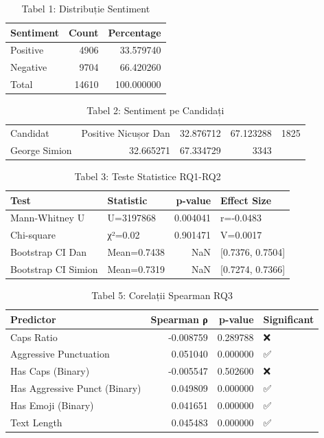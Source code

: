 
\begin{table}
\caption{Tabel 1: Distribuție Sentiment}
\label{tab:tabel_1:_distribuție_sentiment}
\begin{tabular}{lrr}
\toprule
Sentiment & Count & Percentage \\
\midrule
Positive & 4906 & 33.579740 \\
Negative & 9704 & 66.420260 \\
Total & 14610 & 100.000000 \\
\bottomrule
\end{tabular}
\end{table}


\begin{table}
\caption{Tabel 2: Sentiment pe Candidați}
\label{tab:tabel_2:_sentiment_pe_candidaț}
\begin{tabular}{lrrr}
\toprule
Candidat & Positive %
\midrule
Nicușor Dan & 32.876712 & 67.123288 & 1825 \\
George Simion & 32.665271 & 67.334729 & 3343 \\
\bottomrule
\end{tabular}
\end{table}


\begin{table}
\caption{Tabel 3: Teste Statistice RQ1-RQ2}
\label{tab:tabel_3:_teste_statistice_rq1-}
\begin{tabular}{llrl}
\toprule
Test & Statistic & p-value & Effect Size \\
\midrule
Mann-Whitney U & U=3197868 & 0.004041 & r=-0.0483 \\
Chi-square & χ²=0.02 & 0.901471 & V=0.0017 \\
Bootstrap CI Dan & Mean=0.7438 & NaN & [0.7376, 0.7504] \\
Bootstrap CI Simion & Mean=0.7319 & NaN & [0.7274, 0.7366] \\
\bottomrule
\end{tabular}
\end{table}


\begin{table}
\caption{Tabel 5: Corelații Spearman RQ3}
\label{tab:tabel_5:_corelații_spearman_rq}
\begin{tabular}{lrrl}
\toprule
Predictor & Spearman ρ & p-value & Significant \\
\midrule
Caps Ratio & -0.008759 & 0.289788 & ❌ \\
Aggressive Punctuation & 0.051040 & 0.000000 & ✅ \\
Has Caps (Binary) & -0.005547 & 0.502600 & ❌ \\
Has Aggressive Punct (Binary) & 0.049809 & 0.000000 & ✅ \\
Has Emoji (Binary) & 0.041651 & 0.000000 & ✅ \\
Text Length & 0.045483 & 0.000000 & ✅ \\
\bottomrule
\end{tabular}
\end{table}


